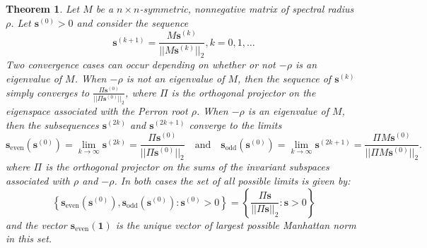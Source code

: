 \documentclass[a4paper,11pt]{report}
\newtheorem{theorem}{Theorem}[section]
\begin{document}
  

 \begin{theorem}\label{grootbewijs}
   Let $M$ be a $n \times n$-symmetric, nonnegative matrix of spectral radius $\rho$. Let $\mathbf{s}^{(0)} > 0$ 
   and consider the sequence
   $$\mathbf{s}^{(k+1)} = \frac{M\mathbf{s}^{(k)}}{||M\mathbf{s}^{(k)}||_2}, k = 0,1,\ldots$$
   Two convergence cases can occur depending on whether or not $-\rho$ is an 
   eigenvalue of $M$. When $-\rho$ is not an eigenvalue of $M$, then the 
   sequence of $\mathbf{s}^{(k)}$ simply converges to 
   $\frac{\Pi \mathbf{s}^{(0)}}{||\Pi \mathbf{s}^{(0)}||_2}$, where $\Pi$ is the orthogonal projector on the 
  eigenspace associated with the Perron root $\rho$. When $-\rho$ is an 
   eigenvalue of $M$, then the subsequences $\mathbf{s}^{(2k)}$ and $\mathbf{s}^{(2k+1)}$ converge to 
   the limits
   $$\mathbf{s}_{\text{even}}(\mathbf{s}^{(0)}) = \lim_{k \to \infty} \mathbf{s}^{(2k)}  = \frac{\Pi \mathbf{s}^{(0)}}{||\Pi \mathbf{s}^{(0)}||_2} \quad \text{and}\quad \mathbf{s}_{\text{odd}}(\mathbf{s}^{(0)}) = \lim_{k \to \infty} \mathbf{s}^{(2k+1)} = \frac{\Pi M \mathbf{s}^{(0)}}{||\Pi M \mathbf{s}^{(0)}||_2}.$$
where $\Pi$ is the orthogonal projector on the sums of the invariant subspaces associated with $\rho$
and $-\rho$. In both cases the set of all possible limits is given by:
$$\left\{\mathbf{s}_{\text{even}}(\mathbf{s}^{(0)}), \mathbf{s}_{\text{odd}}(\mathbf{s}^{(0)}): \mathbf{s}^{(0)} > 0\right\} = \left\{ \frac{\Pi \mathbf{s}}{||\Pi \mathbf{s}||_2}: \mathbf{s} > 0 \right\}$$
and the vector $\mathbf{s}_{\text{even}}(\mathbf{1})$ is the unique vector of largest 
possible Manhattan norm in this set. \end{theorem}
\end{document}
